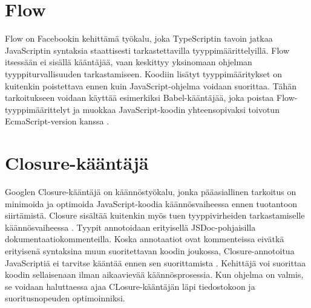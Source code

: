 \section{Flow}
Flow on Facebookin kehittämä työkalu, joka TypeScriptin tavoin jatkaa
JavaScriptin syntaksia staattisesti tarkastettavilla tyyppimäärittelyillä.
Flow itsessään ei sisällä kääntäjää, vaan keskittyy yksinomaan ohjelman
tyyppiturvallisuuden tarkastamiseen. Koodiin lisätyt tyyppimääritykset on
kuitenkin poistettava ennen kuin JavaScript-ohjelma voidaan suorittaa. Tähän
tarkoitukseen voidaan käyttää esimerkiksi Babel-kääntäjää, joka poistaa
Flow-tyyppimäärittelyt ja muokkaa JavaScript-koodin yhteensopivaksi toivotun
EcmaScript-version kanssa \cite{FlowInstallation}.

\section{Closure-kääntäjä}
Googlen Closure-kääntäjä on käännöstyökalu, jonka pääasiallinen tarkoitus
on minimoida ja optimoida JavaScript-koodia käännösvaiheessa ennen tuotantoon
siirtämistä. Closure sisältää kuitenkin myös tuen tyyppivirheiden
tarkastamiselle käännösvaiheessa \cite{ClosureCompiler}. Tyypit annotoidaan
erityisellä JSDoc-pohjaisilla dokumentaatiokommenteilla. Koska annotaatiot
ovat kommenteissa eivätkä erityisenä syntaksina muun suoritettavan koodin
joukossa, Closure-annotoitua JavaScriptiä ei tarvitse kääntää ennen sen
suorittamista \cite{annotatingJSforClosure}. Kehittäjä voi suorittaa koodin
sellaisenaan ilman aikaavievää käännösprosessia. Kun ohjelma on valmis,
se voidaan haluttaessa ajaa CLosure-kääntäjän läpi tiedostokoon
ja suoritusnopeuden optimoinniksi.
